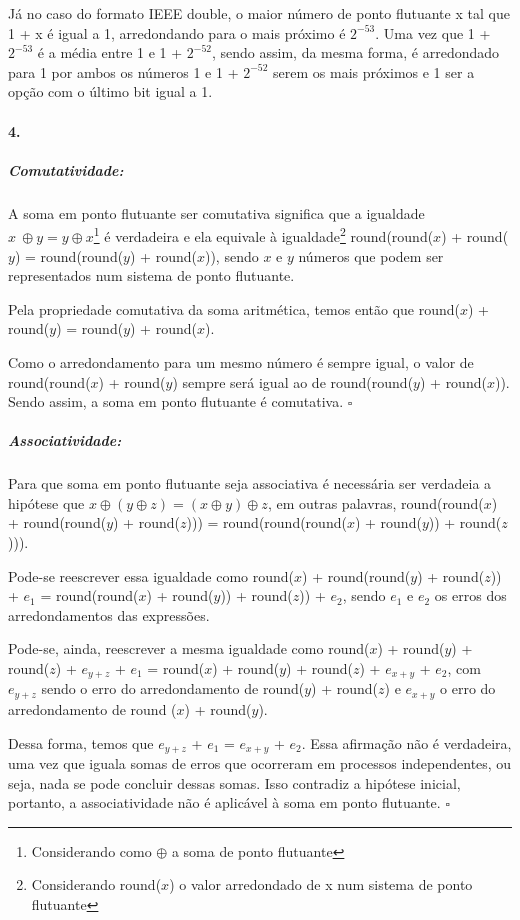 \documentclass{article}
\begin{document}
Já no caso do formato IEEE double, o maior número de ponto flutuante x tal que 1 + x é igual a 1, arredondando para o mais próximo é $2^{-53}$.
Uma vez que 1 + $2^{-53}$ é a média entre 1 e 1 + $2^{-52}$, sendo assim, da mesma forma, é arredondado para 1 por ambos os números 1 e 1 + $2^{-52}$ serem os mais próximos e 1 ser a opção com o último bit igual a 1.

\paragraph*{4.}
\subparagraph{Comutatividade:}
A soma em ponto flutuante ser comutativa significa que a igualdade $x \ \oplus y = y \oplus x$\footnote{Considerando como $\oplus$ a soma de ponto flutuante} é verdadeira e ela equivale à igualdade\footnote{Considerando round($x$) o valor arredondado de x num sistema de ponto flutuante} round(round($x$) + round($y$) = round(round($y$) + round($x$)), sendo $x$ e $y$ números que podem ser representados num sistema de ponto flutuante. 

Pela propriedade comutativa da soma aritmética, temos então que round($x$) + round($y$) = round($y$) + round($x$).

Como o arredondamento para um mesmo número é sempre igual, o valor de round(round($x$) + round($y$) sempre será igual ao de round(round($y$) + round($x$)). Sendo assim, a soma em ponto flutuante é comutativa. $\square$

\subparagraph{Associatividade:}
Para que soma em ponto flutuante seja associativa é necessária ser verdadeia a hipótese que $x \oplus (y \oplus z) = (x \oplus y) \oplus z$, em outras palavras, round(round($x$) + round(round($y$) + round($z$))) = round(round(round($x$) + round($y$)) + round($z$))).

Pode-se reescrever essa igualdade como round($x$) + round(round($y$) + round($z$)) + $e_{1}$ = round(round($x$) + round($y$)) + round($z$)) + $e_{2}$, sendo $e_{1}$ e $e_{2}$ os erros dos arredondamentos das expressões.

Pode-se, ainda, reescrever a mesma igualdade como round($x$) + round($y$) + round($z$) + $e_{y+z}$ + $e_{1}$ = round($x$) + round($y$) + round($z$) + $e_ {x+y}$ + $e_{2}$, com $e_{y+z}$ sendo o erro do arredondamento de round($y$) + round($z$) e $e_ {x+y}$ o erro do arredondamento de round ($x$) + round($y$).

Dessa forma, temos que $e_{y+z}$ + $e_{1}$ = $e_ {x+y}$ + $e_{2}$. Essa afirmação não é verdadeira, uma vez que iguala somas de erros que ocorreram em processos independentes, ou seja, nada se pode concluir dessas somas. Isso contradiz a hipótese inicial, portanto, a associatividade não é aplicável à soma em ponto flutuante. $\square$
\end{document}
